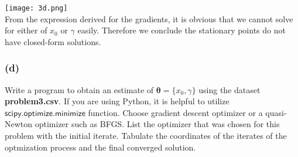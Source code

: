\documentclass[11pt]{article}
\begin{document}
{	\texttt{[image: 3d.png]}
\ \\
    From the expression derived for the gradients, it is obvious that we cannot solve for either of $x_0$ or $\gamma$ easily. Therefore we conclude the stationary points do not have closed-form solutions. 
    
	 }
	 
	 \vfill
	 
\subsubsection*{(d)}
	
	Write a program to obtain an estimate of $\mathbf{\theta} = \{ x_0, \gamma \}$ using the dataset {\bf \mbox{problem3.csv}}.
	If you are using Python, it is helpful to utilize $\mathsf{scipy.optimize.minimize}$ 
	function. Choose gradient descent optimizer or a quasi-Newton optimizer such as BFGS.
	List the optimizer that was chosen for this problem with the initial iterate.
	Tabulate the coordinates of the iterates of the optmization process and the final converged solution.
\end{document}
